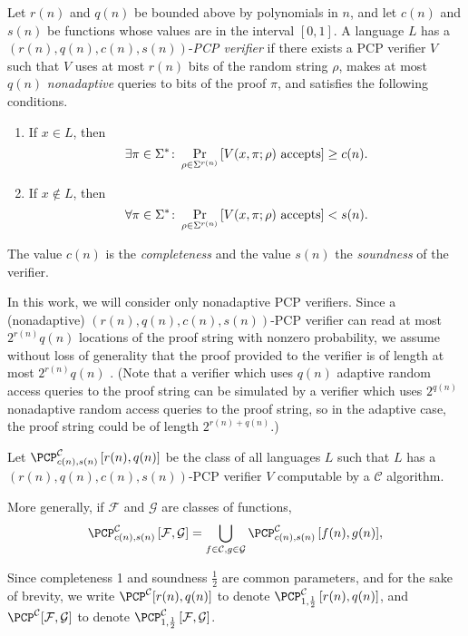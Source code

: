 \documentclass[]{article}
\newcommand{\PCPcs}[5]{\PCP^{#1}_{#2, #3}\left[#4, #5\right]}
\begin{document}
\begin{definition}
  Let $r(n)$ and $q(n)$ be bounded above by polynomials in $n$, and let $c(n)$ and $s(n)$ be functions whose values are in the interval $[0, 1]$.
  A language $L$ has a $(r(n), q(n), c(n), s(n))$-\emph{PCP verifier} if there exists a PCP verifier $V$ such that $V$ uses at most $r(n)$ bits of the random string $\rho$, makes at most $q(n)$ \emph{nonadaptive} queries to bits of the proof $\pi$, and satisfies the following conditions.
  \begin{enumerate}
  \item If $x \in L$, then
    \begin{equation*}
      \exists \pi \in \Sigma^* \colon \Pr_{\rho \in \Sigma^{r(n)}}{\left[V(x, \pi; \rho) \textnormal{ accepts}\right]} \geq c(n).
    \end{equation*}
  \item If $x \notin L$, then
    \begin{equation*}
      \forall \pi \in \Sigma^* \colon \Pr_{\rho \in \Sigma^{r(n)}}{\left[V(x, \pi; \rho) \textnormal{ accepts}\right]} < s(n).
    \end{equation*}
  \end{enumerate}
  The value $c(n)$ is the \emph{completeness} and the value $s(n)$ the \emph{soundness} of the verifier.
\end{definition}

In this work, we will consider only nonadaptive PCP verifiers.
Since a (nonadaptive) $(r(n), q(n), c(n), s(n))$-PCP verifier can read at most $2^{r(n)} q(n)$ locations of the proof string with nonzero probability, we assume without loss of generality that the proof provided to the verifier is of length at most $2^{r(n)} q(n)$ \cite[Remark~11.6]{ab09}.
(Note that a verifier which uses $q(n)$ adaptive random access queries to the proof string can be simulated by a verifier which uses $2^{q(n)}$ nonadaptive random access queries to the proof string, so in the adaptive case, the proof string could be of length $2^{r(n) + q(n)}$.)

\begin{definition}
  Let $\PCPcs{\mathcal{C}}{c(n)}{s(n)}{r(n)}{q(n)}$ be the class of all languages $L$ such that $L$ has a $(r(n), q(n), c(n), s(n))$-PCP verifier $V$ computable by a $\mathcal{C}$ algorithm.

  More generally, if $\mathcal{F}$ and $\mathcal{G}$ are classes of functions,
  \begin{equation*}
    \PCPcs{\mathcal{C}}{c(n)}{s(n)}{\mathcal{F}}{\mathcal{G}} = \bigcup_{f \in \mathcal{C}, g \in \mathcal{G}}{\PCPcs{\mathcal{C}}{c(n)}{s(n)}{f(n)}{g(n)}},
    \end{equation*}

  Since completeness 1 and soundness $\frac{1}{2}$ are common parameters, and for the sake of brevity, we write $\PCP^{\mathcal{C}}[r(n), q(n)]$ to denote $\PCPcs{\mathcal{C}}{1}{\frac{1}{2}}{r(n)}{q(n)}$, and $\PCP^{\mathcal{C}}[\mathcal{F}, \mathcal{G}]$ to denote $\PCPcs{\mathcal{C}}{1}{\frac{1}{2}}{\mathcal{F}}{\mathcal{G}}$.
\end{definition}
\end{document}
